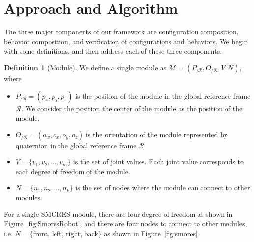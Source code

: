 \documentclass[conference]{IEEEtran}
\theoremstyle{definition}
\newtheorem{definition}{Definition}[section]
\begin{document}
\section{Approach and Algorithm}
\label{sec:approach}
The three major components of our framework are configuration composition, behavior
composition, and verification of configurations and behaviors.  We begin with some definitions, and then
address each of these three components.
\begin{definition}[Module] 
We define a single module  as $\mathcal{M}=(P_{/\mathcal{R}}, O_{/\mathcal{R}}, V, N)$, where
\begin{itemize}
\item $P_{/\mathcal{R}}=(p_x,p_y,p_z)$ is the position of the module in the global reference frame $\mathcal{R}$. We consider the position the center of the module as the position of the module.
\item $O_{/\mathcal{R}}=(o_w, o_x, o_y, o_z)$ is the orientation of the module represented by quaternion in the global reference frame $\mathcal{R}$.
\item $V=\{v_1, v_2, ..., v_m\}$ is the set of joint values. Each joint value corresponds to each degree of freedom of the module.
\item $N=\{n_1, n_2, ..., n_k\}$ is the set of nodes where the module can connect to other modules.
\end{itemize}
For a single SMORES module, there are four degree of freedom as shown in Figure~\ref{fig:SmoresRobot}, and there are four nodes to connect to other modules, i.e. $N=\{$front, left, right, back$\}$ as shown in Figure~\ref{fig:smores}.


\end{definition}
\end{document}
